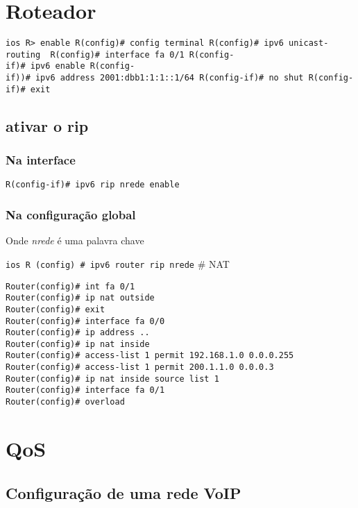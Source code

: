 \documentclass[]{article}
\begin{document}
\section{Roteador}\label{roteador}

\texttt{ios\ R\textgreater{}\ enable\ R(config)\#\ config\ terminal\ R(config)\#\ ipv6\ unicast-routing\ \ R(config)\#\ interface\ fa\ 0/1\ R(config-if)\#\ ipv6\ enable\ R(config-if))\#\ ipv6\ address\ 2001:dbb1:1:1::1/64\ R(config-if)\#\ no\ shut\ R(config-if)\#\ exit}

\subsection{ativar o rip}\label{ativar-o-rip}

\subsubsection{Na interface}\label{na-interface}

\begin{verbatim}
R(config-if)# ipv6 rip nrede enable
\end{verbatim}

\subsubsection{Na configuração
global}\label{na-configurauxe7uxe3o-global}

Onde \emph{nrede} é uma palavra chave

\texttt{ios\ R\ (config)\ \#\ ipv6\ router\ rip\ nrede} \# NAT

\begin{verbatim}
Router(config)# int fa 0/1
Router(config)# ip nat outside
Router(config)# exit 
Router(config)# interface fa 0/0
Router(config)# ip address ..
Router(config)# ip nat inside 
Router(config)# access-list 1 permit 192.168.1.0 0.0.0.255
Router(config)# access-list 1 permit 200.1.1.0 0.0.0.3
Router(config)# ip nat inside source list 1
Router(config)# interface fa 0/1
Router(config)# overload
\end{verbatim}

\section{QoS}\label{qos}

\subsection{Configuração de uma rede
VoIP}\label{configurauxe7uxe3o-de-uma-rede-voip}
\end{document}
